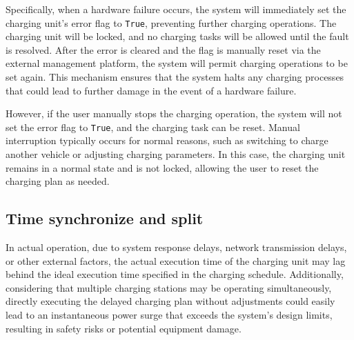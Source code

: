 \documentclass[
	english,
	ruledheaders=section,%
	class=report,%
	thesis={type=Report},%
	accentcolor=9c,%
	custommargins=true,%
	marginpar=false,%
	parskip=half-,%
	fontsize=11pt,%
	logofile={img/tuda_logo.pdf}, %
]{tudapub}
\begin{document}
\begin{enumerate}[label=\Alph*.]

    Specifically, when a hardware failure occurs, the system will immediately set the charging unit's error flag to \texttt{True}, preventing further charging operations. The charging unit will be locked, and no charging tasks will be allowed until the fault is resolved. After the error is cleared and the flag is manually reset via the external management platform, the system will permit charging operations to be set again. This mechanism ensures that the system halts any charging processes that could lead to further damage in the event of a hardware failure.


    However, if the user manually stops the charging operation, the system will not set the error flag to \texttt{True}, and the charging task can be reset. Manual interruption typically occurs for normal reasons, such as switching to charge another vehicle or adjusting charging parameters. In this case, the charging unit remains in a normal state and is not locked, allowing the user to reset the charging plan as needed.
    
\end{enumerate}

\subsection{Time synchronize and split}
\label{subsec: timeSynchronAndSplit}
    

In actual operation, due to system response delays, network transmission delays, or other external factors, the actual execution time of the charging unit may lag behind the ideal execution time specified in the charging schedule. Additionally, considering that multiple charging stations may be operating simultaneously, directly executing the delayed charging plan without adjustments could easily lead to an instantaneous power surge that exceeds the system's design limits, resulting in safety risks or potential equipment damage.
\end{document}
